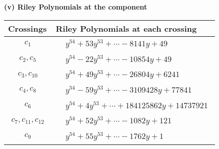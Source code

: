 \documentclass[1p]{elsarticle_modified}
\theoremstyle{definition}
\begin{document}
\flushleft \textbf{(v) Riley Polynomials at the component}\newline \\
\begin{tabular}{m{50pt}|m{274pt}}
Crossings & \hspace{64pt}Riley Polynomials at each crossing \\
\hline $$\begin{aligned}c_{1}\end{aligned}$$&$\begin{aligned}
&y^{54}+53 y^{53}+\cdots-8141 y+49
\end{aligned}$\\
\hline $$\begin{aligned}c_{2},c_{5}\end{aligned}$$&$\begin{aligned}
&y^{54}-22 y^{53}+\cdots-10854 y+49
\end{aligned}$\\
\hline $$\begin{aligned}c_{3},c_{10}\end{aligned}$$&$\begin{aligned}
&y^{54}+49 y^{53}+\cdots-26804 y+6241
\end{aligned}$\\
\hline $$\begin{aligned}c_{4},c_{8}\end{aligned}$$&$\begin{aligned}
&y^{54}-59 y^{53}+\cdots-3109428 y+77841
\end{aligned}$\\
\hline $$\begin{aligned}c_{6}\end{aligned}$$&$\begin{aligned}
&y^{54}+4 y^{53}+\cdots+184125862 y+14737921
\end{aligned}$\\
\hline $$\begin{aligned}c_{7},c_{11},c_{12}\end{aligned}$$&$\begin{aligned}
&y^{54}+52 y^{53}+\cdots-1082 y+121
\end{aligned}$\\
\hline $$\begin{aligned}c_{9}\end{aligned}$$&$\begin{aligned}
&y^{54}+55 y^{53}+\cdots-1762 y+1
\end{aligned}$\\
\hline
\end{tabular}\\~\\
\end{document}
